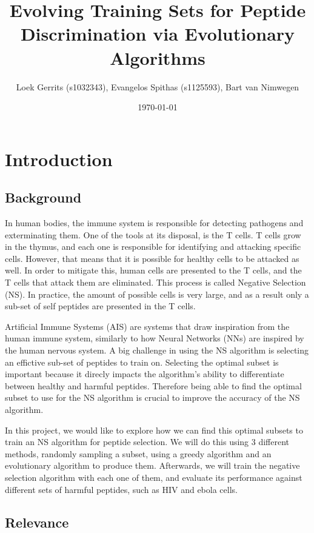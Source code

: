 \documentclass{article}
\title{Evolving Training Sets for Peptide Discrimination via Evolutionary Algorithms}
\author{Loek Gerrits (s1032343), Evangelos Spithas (s1125593), Bart van Nimwegen}
\date{\today}
\begin{document}
 

\maketitle

\section{Introduction}

\subsection{Background}

In human bodies, the immune system is responsible for detecting pathogens and exterminating them. 
One of the tools at its disposal, is the T cells. T cells grow in the thymus, and each one is responsible for
identifying and attacking specific cells. However, that means that it is possible for healthy cells to be
attacked as well. In order to mitigate this, human cells are presented to the T cells, and the T cells that attack them 
are eliminated. This process is called Negative Selection (NS). In practice, the amount of possible cells is very large, and as a result only a sub-set of self peptides are presented
in the T cells. 

Artificial Immune Systems (AIS) are systems that draw inspiration from the human immune system, similarly to how Neural 
Networks (NNs) are inspired by the human nervous system. A big challenge in using the NS algorithm is selecting an effictive sub-set of peptides to train on.
Selecting the optimal subset is important because it direcly impacts the algorithm's ability to differentiate between healthy and harmful peptides.
Therefore being able to find the optimal subset to use for the NS algorithm is crucial to improve the accuracy of the NS algorithm.  

In this project, we would like to explore how we can find this optimal subsets to train an NS algorithm for peptide selection. We will do this using 3 different methods, randomly 
sampling a subset, using a greedy algorithm and an evolutionary algorithm to produce them. Afterwards, we will train the 
negative selection algorithm with each one of them, and evaluate its performance against different sets of harmful 
peptides, such as HIV and ebola cells. 

\subsection{Relevance}
\end{document}
